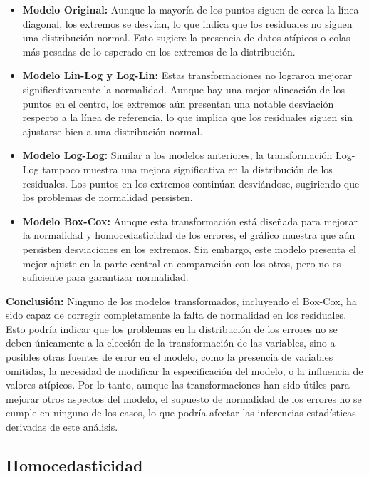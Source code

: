 \documentclass[
]{article}
\begin{document}
\begin{itemize}
\item
  \textbf{Modelo Original:} Aunque la mayoría de los puntos siguen de
  cerca la línea diagonal, los extremos se desvían, lo que indica que
  los residuales no siguen una distribución normal. Esto sugiere la
  presencia de datos atípicos o colas más pesadas de lo esperado en los
  extremos de la distribución.
\item
  \textbf{Modelo Lin-Log y Log-Lin:} Estas transformaciones no lograron
  mejorar significativamente la normalidad. Aunque hay una mejor
  alineación de los puntos en el centro, los extremos aún presentan una
  notable desviación respecto a la línea de referencia, lo que implica
  que los residuales siguen sin ajustarse bien a una distribución
  normal.
\item
  \textbf{Modelo Log-Log:} Similar a los modelos anteriores, la
  transformación Log-Log tampoco muestra una mejora significativa en la
  distribución de los residuales. Los puntos en los extremos continúan
  desviándose, sugiriendo que los problemas de normalidad persisten.
\item
  \textbf{Modelo Box-Cox:} Aunque esta transformación está diseñada para
  mejorar la normalidad y homocedasticidad de los errores, el gráfico
  muestra que aún persisten desviaciones en los extremos. Sin embargo,
  este modelo presenta el mejor ajuste en la parte central en
  comparación con los otros, pero no es suficiente para garantizar
  normalidad.
\end{itemize}

\textbf{Conclusión:} Ninguno de los modelos transformados, incluyendo el
Box-Cox, ha sido capaz de corregir completamente la falta de normalidad
en los residuales. Esto podría indicar que los problemas en la
distribución de los errores no se deben únicamente a la elección de la
transformación de las variables, sino a posibles otras fuentes de error
en el modelo, como la presencia de variables omitidas, la necesidad de
modificar la especificación del modelo, o la influencia de valores
atípicos. Por lo tanto, aunque las transformaciones han sido útiles para
mejorar otros aspectos del modelo, el supuesto de normalidad de los
errores no se cumple en ninguno de los casos, lo que podría afectar las
inferencias estadísticas derivadas de este análisis.

\subsection{\texorpdfstring{\textbf{Homocedasticidad}}{Homocedasticidad}}\label{homocedasticidad}
\end{document}

